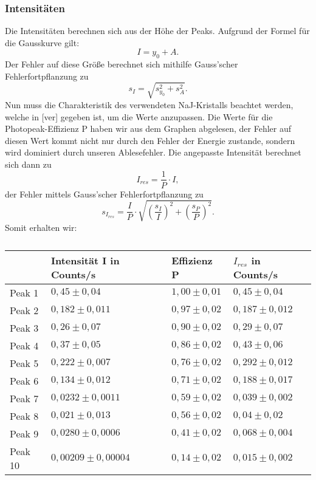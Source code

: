 \subsubsection{Intensitäten}
Die Intensitäten berechnen sich aus der Höhe der Peaks. Aufgrund der Formel für die Gausskurve gilt: \[I=y_{0}+A.\] 
Der Fehler auf diese Größe berechnet sich mithilfe Gauss'scher Fehlerfortpflanzung zu 
\[s_{I}=\sqrt{s_{y_{0}}^{2}+s_{A}^{2}}.\] 
Nun muss die Charakteristik des verwendeten NaJ-Kristalls beachtet werden, welche in [ver] gegeben ist, um die Werte anzupassen. Die Werte für die Photopeak-Effizienz P haben wir aus dem Graphen abgelesen, der Fehler auf diesen Wert kommt nicht nur durch den Fehler der Energie zustande, sondern wird dominiert durch unseren Ablesefehler. Die angepasste Intensität berechnet sich dann zu \[I_{res}=\frac{1}{P}\cdot I,\]
der Fehler mittels Gauss'scher Fehlerfortpflanzung zu 
\[s_{I_{res}}=\frac{I}{P}\cdot\sqrt{\left(\frac{s_{I}}{I}\right)^{2}+\left(\frac{s_{P}}{P}\right)^{2}}.\]
\clearpage
Somit erhalten wir:
\begin{table}[htbp]
\begin{center}
\caption{}
\begin{tabular}{|l|l|l|l|}
\hline
 & Intensität I in Counts/s & Effizienz P & $I_{res}$ in Counts/s \\ \hline
Peak 1 & $0,45\pm0,04$ & $1,00\pm0,01$ & $0,45\pm0,04$ \\ \hline
Peak 2 & $0,182\pm0,011$ & $0,97\pm0,02$ & $0,187\pm0,012$ \\ \hline
Peak 3 & $0,26\pm0,07$ & $0,90\pm0,02$ & $0,29\pm0,07$ \\ \hline
Peak 4 & $0,37\pm0,05$ & $0,86\pm0,02$ & $0,43\pm0,06$ \\ \hline
Peak 5 & $0,222\pm0,007$ & $0,76\pm0,02$ & $0,292\pm0,012$ \\ \hline
Peak 6 & $0,134\pm0,012$ & $0,71\pm0,02$ & $0,188\pm0,017$ \\ \hline
Peak 7 & $0,0232\pm0,0011$ & $0,59\pm0,02$ & $0,039\pm0,002$ \\ \hline
Peak 8 & $0,021\pm0,013$ & $0,56\pm0,02$ & $0,04\pm0,02$ \\ \hline
Peak 9 & $0,0280\pm0,0006$ & $0,41\pm0,02$ & $0,068\pm0,004$ \\ \hline
Peak 10 & $0,00209\pm0,00004$ & $0,14\pm0,02$ & $0,015\pm0,002$ \\ \hline
\end{tabular}
\end{center}
\label{}
\end{table}
